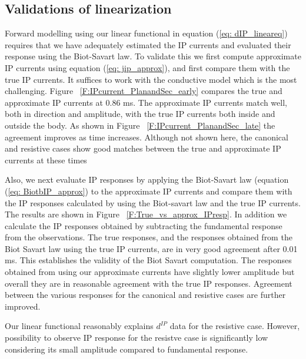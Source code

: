 \documentclass[extra,mreferee]{gji}
\newcommand{\dip}{d^{IP}}
\begin{document}
\subsection{Validations of linearization}
Forward modelling using our linear functional in equation (\ref{eq: dIP_lineareq}) requires that we have adequately estimated the IP currents and evaluated their response using the Biot-Savart law. To validate this we first compute approximate IP currents using equation (\ref{eq: jip_approx}), and first compare them with the true IP currents. It suffices to work with the conductive model which is the most challenging. Figure ~\ref{F:IPcurrent_PlanandSec_early} compares the true and approximate IP currents at 0.86 ms. The approximate IP currents match well, both in direction and amplitude, with the true IP currents both inside and outside the body. As shown in Figure ~\ref{F:IPcurrent_PlanandSec_late} the agreement improves as time increases. Although not shown here, the canonical and resistive cases show good matches between the true and approximate IP currents at these times

Also, we next evaluate IP responses by applying the Biot-Savart law (equation (\ref{eq: BiotbIP_approx}) to the approximate IP currents and compare them with the IP responses calculated by using the Biot-savart law and the true IP currents. The results are shown in Figure ~\ref{F:True_vs_approx_IPresp}. In addition we calculate the IP responses obtained by subtracting the fundamental response from the observations. The true responses, and the responses obtained from the Biot Savart law using the true IP currents, are in very good agreement after 0.01 ms. This establishes the validity of the Biot Savart computation. The responses obtained from using our approximate currents have slightly lower amplitude but overall they are in reasonable agreement with the true IP responses. Agreement between the various responses for the canonical and resistive cases are further improved.

Our linear functional reasonably explains $\dip$ data for the resistive case. However, possibility to observe IP response for the resistve case is significantly low considering its small amplitude compared to fundamental response. 
\end{document}
